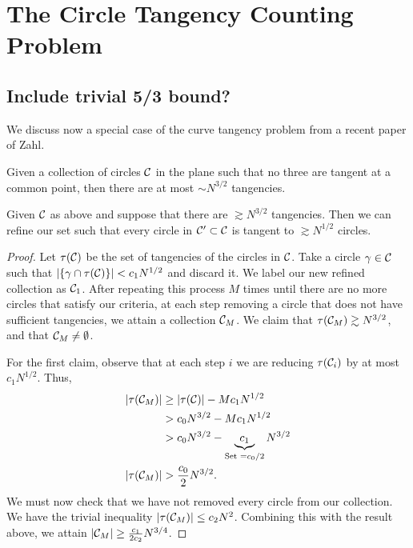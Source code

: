 \chapter{The Circle Tangency Counting Problem}
\section{Include trivial 5/3 bound?}

We discuss now a special case of the curve tangency problem from a recent paper of Zahl. \cite{ellenberg2016new}

\begin{theorem}
    Given a collection of circles $\mathcal C$ in the plane such that no three are tangent at a common point, then there are at most $\sim N^{3/2}$ tangencies. 
\end{theorem}
\begin{lemma}
    Given $\mathcal C$ as above and suppose that there are $\gtrsim N^{3/2}$ tangencies. Then we can refine our set such that every circle in $\mathcal C' \subset \mathcal C$ is tangent to $\gtrsim N^{1/2}$ circles.
\end{lemma}
\begin{proof}
Let $\tau(\mathcal C)$ be the set of tangencies of the circles in $\mathcal C$. Take a circle $\gamma \in \mathcal C$ such that $|\{\gamma \cap \tau(\mathcal C)\}| < c_1 N^{1/2}$
and discard it. We label our new refined collection as $\mathcal C_1$. After repeating this process $M$ times until there are no more circles that satisfy our criteria, at each step removing a circle that does not have sufficient
tangencies, we attain a collection $\mathcal C_M$. We claim that $\tau(\mathcal C_M) \gtrsim N^{3/2}$, and that $\mathcal C_M \neq \emptyset$.

For the first claim, observe that at each step $i$ we are reducing $\tau(\mathcal C_i)$ by at most $c_1 N^{1/2}$.  Thus,
\begin{align*}
    |\tau(\mathcal C_M)| &\geq |\tau(\mathcal C)| - M c_1 N^{1/2} \\
    &> c_0 N^{3/2} -  M c_1 N^{1/2} \\ 
    &> c_0 N^{3/2} - \underbrace{c_1}_{\text{Set } = c_0/2} N^{3/2} \\
    |\tau(\mathcal C_M)| &> \frac{c_0}{2} N^{3/2}.
\end{align*}
We must now check that we have not removed every circle from our collection. We have the trivial inequality $|\tau(\mathcal C_M)| \leq c_2 N^{2}$. Combining this with the result above, we attain $|\mathcal C_M| \geq \frac{c_1}{2c_2} N^{3/4}$.
\end{proof}
